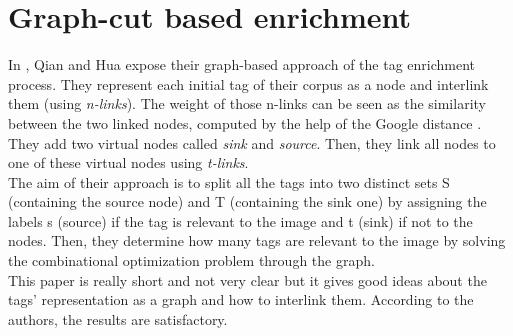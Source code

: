 \section{Graph-cut based enrichment} %
\label{sec:graph_cut_based_enrichment}
In \cite{qian2011graph}, Qian and Hua expose their graph-based approach of the tag enrichment process. They represent each initial tag of their corpus as a node and interlink them (using \emph{n-links}). The weight of those n-links can be seen as the similarity between the two linked nodes, computed by the help of the Google distance \cite{cilibrasi2007google}. They add two virtual nodes called \emph{sink} and \emph{source}. Then, they link all nodes to one of these virtual nodes using \emph{t-links}.\\
The aim of their approach is to split all the tags into two distinct sets S (containing the source node) and T (containing the sink one) by assigning the labels s (source) if the tag is relevant to the image and t (sink) if not to the nodes. Then, they determine how many tags are relevant to the image by solving the combinational optimization problem through the graph.\\
This paper is really short and not very clear but it gives good ideas about the tags' representation as a graph and how to interlink them. According to the authors, the results are satisfactory.   


